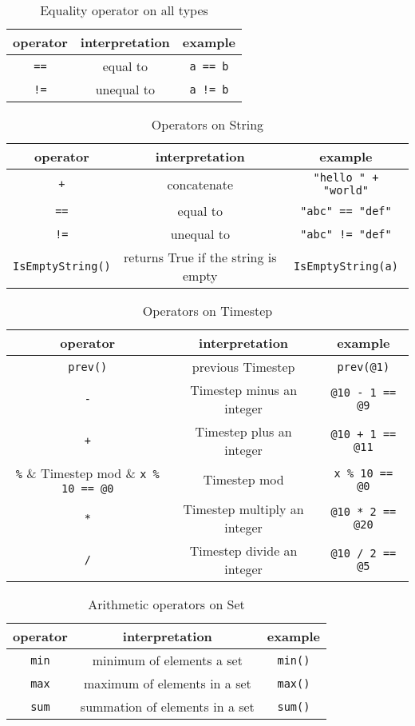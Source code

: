 \documentclass[12pt]{article}
\begin{document}
\begin{table}[H]
\centering
\caption{Equality operator on all types}
\begin{tabular}{ c c c }
\toprule 
operator & interpretation & example \\
\midrule
{\tt ==} & equal to & \verb|a == b|   \\ 
{\tt !=} & unequal to & \verb|a != b|  \\ 
\bottomrule
\end{tabular}
\end{table}

\begin{table}[H]
\centering
\caption{Operators on String}
\begin{tabular}{ c c c }
\toprule 
operator & interpretation & example \\
\midrule
{\tt +} & concatenate & \verb|"hello " + "world"|  \\ 
{\tt ==} & equal to & \verb|"abc" == "def"|  \\
{\tt !=} & unequal to & \verb|"abc" != "def"|\\ 
\verb|IsEmptyString()| & returns True if the string is empty & \verb|IsEmptyString(a)| \\
\bottomrule
\end{tabular}
\end{table}

\begin{table}[H]
\centering
\caption{Operators on Timestep}
\begin{tabular}{ c c c }
\toprule 
operator & interpretation & example \\
\midrule
\verb|prev()| & previous Timestep & \verb|prev(@1)|  \\
\verb|-| & Timestep minus an integer & \verb|@10 - 1 == @9|  \\
\verb|+| & Timestep plus an integer & \verb|@10 + 1 == @11|  \\
\verb|%| &  Timestep mod & \verb|x % 10 == @0|  \\
\verb|*| & Timestep multiply an integer & \verb|@10 * 2 == @20|  \\
\verb|/| & Timestep divide an integer & \verb|@10 / 2 == @5|  \\
\bottomrule
\end{tabular}
\end{table}

\begin{table}[H]
\centering
\caption{Arithmetic operators on Set}
\begin{tabular}{ c c c }
\toprule 
operator & interpretation & example \\
\midrule
\verb|min| & minimum of elements a set & \verb|min()|\\ 
\verb|max| & maximum of elements in a set & \verb|max()|\\
\verb|sum| & summation of elements in a set & \verb|sum()|\\ 
\bottomrule
\end{tabular}
\end{table}
\end{document}
